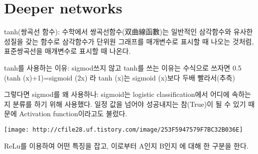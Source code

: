 \documentclass[11pt]{article}
\makeatletter
\def\maxwidth{\ifdim\Gin@nat@width>\linewidth\linewidth
    \else\Gin@nat@width\fi}
\let\Oldincludegraphics\includegraphics
\renewcommand{\includegraphics}[1]{\Oldincludegraphics[width=.8\maxwidth]{#1}}
\makeatother
\begin{document}
    \section{Deeper networks}\label{deeper-networks}

    tanh(쌍곡선 함수): 수학에서 쌍곡선함수(双曲線函數)는 일반적인 삼각함수와
유사한 성질을 갖는 함수로 삼각함수가 단위원 그래프를 매개변수로 표시할
때 나오는 것처럼, 표준쌍곡선을 매개변수로 표시할 때 나온다.

tanh를 사용하는 이유: sigmod쓰지 않고 tanh를 쓰는 이유는 수식으로 쓰자면
0.5 (tanh (x)+1)=sigmoid (2x) 라 tanh (x)는 sigmoid (x)보다 두배
빨라서(추측)

그렇다면 sigmod를 왜 사용하나: sigmoid는 logistic classification에서
어디에 속하는지 분류를 하기 위해 사용했다. 일정 값을 넘어야 성공내지는
참(True)이 될 수 있기 때문에 Activation function이라고도 불렀다.

    
\texttt{[image: http://cfile28.uf.tistory.com/image/253F5947579F7BC32B036E]}

    ReLu를 이용하여 어떤 특징을 잡고, 이로부터 A인지 B인지 에 대해 한 구분을
한다.
\end{document}
